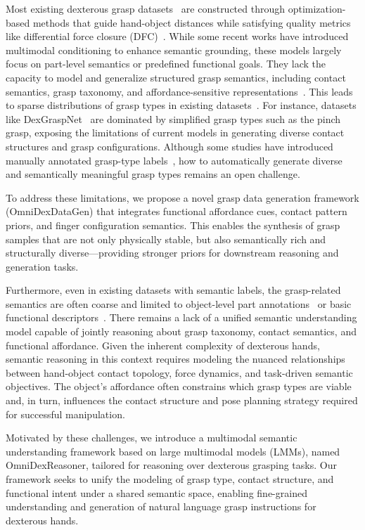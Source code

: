 Most existing dexterous grasp datasets~\cite{wang2022dexgraspnet,zhang2024contactdexnet} are constructed through optimization-based methods that guide hand-object distances while satisfying quality metrics like differential force closure (DFC)~\cite{liu2021synthesizing}. While some recent works have introduced multimodal conditioning to enhance semantic grounding, these models largely focus on part-level semantics or predefined functional goals. They lack the capacity to model and generalize structured grasp semantics, including contact semantics, grasp taxonomy, and affordance-sensitive representations~\cite{wang2022dexgraspnet,zhang2024contactdexnet,murali2025graspgen,zhong2025dexgrasp}. This leads to sparse distributions of grasp types in existing datasets~\cite{wang2022dexgraspnet,zhong2025dexgrasp}. For instance, datasets like DexGraspNet~\cite{wang2022dexgraspnet} are dominated by simplified grasp types such as the pinch grasp, exposing the limitations of current models in generating diverse contact structures and grasp configurations. Although some studies have introduced manually annotated grasp-type labels~\cite{chen2025dexonomy}, how to automatically generate diverse and semantically meaningful grasp types remains an open challenge. 

To address these limitations, we propose a novel grasp data generation framework (OmniDexDataGen) that integrates functional affordance cues, contact pattern priors, and finger configuration semantics. This enables the synthesis of grasp samples that are not only physically stable, but also semantically rich and structurally diverse—providing stronger priors for downstream reasoning and generation tasks.

Furthermore, even in existing datasets with semantic labels, the grasp-related semantics are often coarse and limited to object-level part annotations~\cite{song2025learning} or basic functional descriptors~\cite{zhang2023functionalgrasp}. There remains a lack of a unified semantic understanding model capable of jointly reasoning about grasp taxonomy, contact semantics, and functional affordance. Given the inherent complexity of dexterous hands, semantic reasoning in this context requires modeling the nuanced relationships between hand-object contact topology, force dynamics, and task-driven semantic objectives. The object’s affordance often constrains which grasp types are viable and, in turn, influences the contact structure and pose planning strategy required for successful manipulation. 

Motivated by these challenges, we introduce a multimodal semantic understanding framework based on large multimodal models (LMMs), named OmniDexReasoner, tailored for reasoning over dexterous grasping tasks. Our framework seeks to unify the modeling of grasp type, contact structure, and functional intent under a shared semantic space, enabling fine-grained understanding and generation of natural language grasp instructions for dexterous hands.


